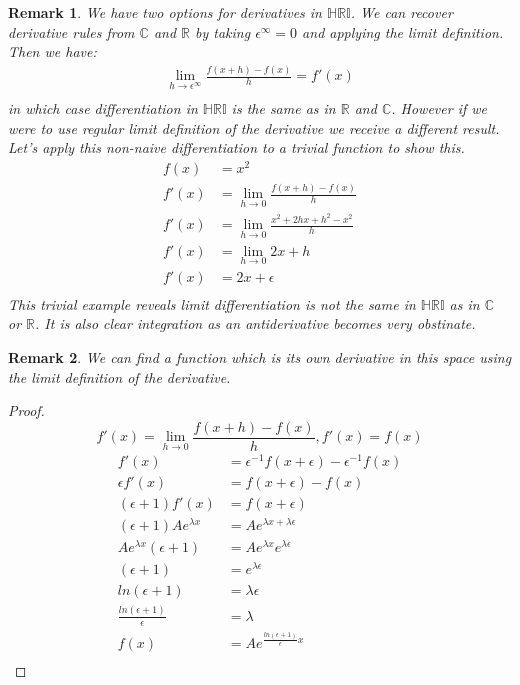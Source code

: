 \documentclass[10pt, oneside]{article}
\newcommand{\R}{\mathbb{R}}
\newcommand{\C}{\mathbb{C}}
\newcommand{\HRI}{\mathbb{HRI}}
\newtheorem{rem}{Remark}
\begin{document}
\begin{rem}
    We have two options for derivatives in $\HRI$. We can recover derivative rules from $\C$ and $\R$ by taking $\epsilon^{\infty} = 0$ and applying the limit definition. Then we have:
    \begin{align*}
        \lim_{h \to \epsilon^{\infty}}  \frac{f(x+h)-f(x)}{h} = f'(x) \\
    \end{align*}
    in which case differentiation in $\HRI$ is the same as in $\R$ and $\C$.
    However if we were to use regular limit definition of the derivative we receive a different result. Let's apply this non-naive differentiation to a trivial function to show this. 
    \begin{align*}
        f(x)&=x^2\\
        f'(x)&=\lim_{h \to 0} \frac{f(x+h)-f(x)}{h}\\
        f'(x)&= \lim_{h \to 0} \frac{x^2+2hx+h^2-x^2}{h}\\
        f'(x) &= \lim_{h \to 0} 2x+h    \\
        f'(x) &= 2x+\epsilon\\
    \end{align*}
    This trivial example reveals limit differentiation is not the same in $\HRI$ as in $\C$ or $\R$. It is also clear integration as an antiderivative becomes very obstinate. 
\end{rem}
\begin{rem}
    We can find a function which is its own derivative in this space using the limit definition of the derivative.
\end{rem}
\begin{proof}
    \[
    f'(x) = \lim_{h \to 0} \frac{f(x+h)-f(x)}{h}, 
    f'(x) = f(x)
    \]
    \begin{align*}
        f'(x) &= \epsilon^{-1} f(x+\epsilon)-\epsilon^{-1} f(x) \\
        \epsilon f'(x) &= f(x+\epsilon)- f(x) \\
        (\epsilon + 1)f'(x) &= f(x + \epsilon) \\
        (\epsilon + 1)Ae^{\lambda x} &= Ae^{\lambda x+\lambda \epsilon} \\
        Ae^{\lambda x} (\epsilon + 1) &= Ae^{\lambda x}e^{\lambda \epsilon} \\
        (\epsilon + 1) &= e^{\lambda \epsilon} \\
        ln(\epsilon + 1) &= \lambda \epsilon \\
        \frac{ln(\epsilon + 1)}{\epsilon} &= \lambda \\
        f(x) &= Ae^{\frac{ln(\epsilon + 1)}{\epsilon}x}\\
    \end{align*}
\end{proof}
\end{document}
